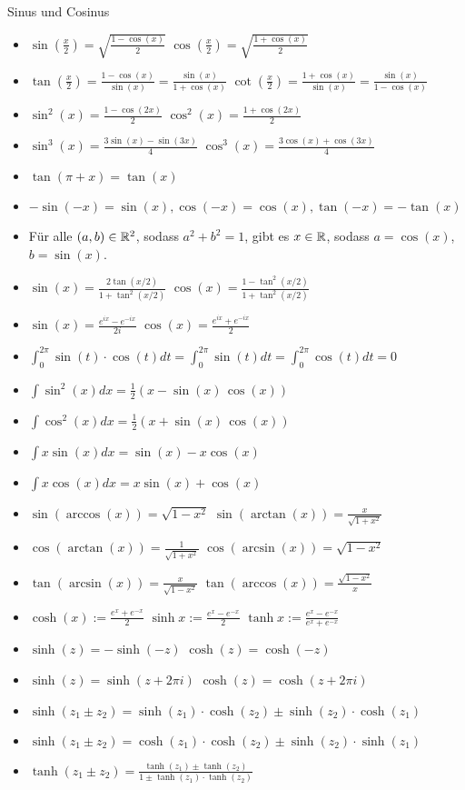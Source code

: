 \begin{Rechenregeln}{Sinus und Cosinus}{}
\begin{itemize}
    \item $\sin(\frac{x}{2}) = \sqrt{\frac{1-\cos(x)}{2}}$ \abstand $\cos(\frac{x}{2}) = \sqrt{\frac{1+\cos(x)}{2}}$
    \item $\tan(\frac{x}{2}) = \frac{1-\cos(x)}{\sin(x)} = \frac{\sin(x)}{1+\cos(x)}$ \abstand $\cot(\frac{x}{2}) = \frac{1+\cos(x)}{\sin(x)} = \frac{\sin(x)}{1-\cos(x)}$
    \item $\sin^2(x) = \frac{1-\cos(2x)}{2}$
    \abstand $\cos^2(x) = \frac{1+\cos(2x)}{2}$
    \item $\sin^3(x) = \frac{3\sin(x) - \sin(3x)}{4}$ 
    \abstand $\cos^3(x) = \frac{3\cos(x) + \cos(3x)}{4}$
    \item $\tan(\pi + x) = \tan(x)$
    \item $-\sin(-x) = \sin(x), \cos(-x) = \cos(x), \tan(-x) = -\tan(x)$
    \item Für alle $(a,b)\in \mathbb{R}^2$, sodass $a^2+b^2 = 1$, gibt es $x\in\mathbb{R}$, sodass $a = \cos(x)$, $b = \sin(x)$.
    \item $\sin(x) = \frac{2\tan(x/2)}{1+\tan^2(x/2)}$
    \abstand $\cos(x) = \frac{1-\tan^2(x/2)}{1+\tan^2(x/2)}$
    \item $\sin(x) = \frac{e^{ix} - e^{-ix}}{2i}$
    \abstand $\cos(x) = \frac{e^{ix} + e^{-ix}}{2}$
    \item $\int_0^{2\pi} \sin(t)\cdot \cos(t) dt = \int_0^{2\pi} \sin(t) dt = \int_0^{2\pi} \cos(t) dt = 0$
    \item $\int \sin^2(x) dx = \frac{1}{2} (x-\sin(x) \, \cos(x))$
    \item $\int \cos^2(x) dx = \frac{1}{2} (x+\sin(x) \, \cos(x))$
    \item $\int x \sin(x) dx = \sin (x)-x \cos (x)$
    \item $\int x \cos(x) dx = x \sin (x)+\cos (x)$
    \item \(\sin(\arccos(x)) = \sqrt{1-x^{2}}\) \abstand \(\sin(\arctan(x)) = \frac{x}{\sqrt{1+x^{2}}}\) 
    \item \(\cos(\arctan(x)) = \frac{1}{\sqrt{1+x^{2}}}\) \abstand \(\cos(\arcsin(x)) = \sqrt{1-x^{2}}\) 
    \item \(\tan(\arcsin(x)) = \frac{x}{\sqrt{1-x^{2}}}\) \abstand \(\tan(\arccos(x)) = \frac{\sqrt{1-x^{2}}}{x}\)
    \item $\cosh(x) := \frac{e^x + e^{-x}}{2}$ \abstand $\sinh x := \frac{e^x - e^{-x}}{2}$ \abstand $\tanh x := \frac{e^x - e^{-x}}{e^x + e^{-x}}$
    \item $\sinh(z) = -\sinh(-z)$ \abstand $\cosh(z) = \cosh(-z)$ 
    \item $\sinh(z) = \sinh(z + 2\pi i)$ \abstand $\cosh(z) = \cosh(z+ 2\pi i)$
    \item $\sinh(z_1 \pm z_2) = \sinh(z_1) \cdot \cosh(z_2) \pm \sinh(z_2) \cdot \cosh(z_1)$
    \item $\sinh(z_1 \pm z_2) = \cosh(z_1) \cdot \cosh(z_2) \pm \sinh(z_2) \cdot \sinh(z_1)$
    \item $\tanh(z_1 \pm z_2) = \frac{\tanh(z_1) \pm \tanh(z_2)}{1 \pm \tanh(z_1)\cdot \tanh(z_2)}$
    \end{itemize}
\end{Rechenregeln}

